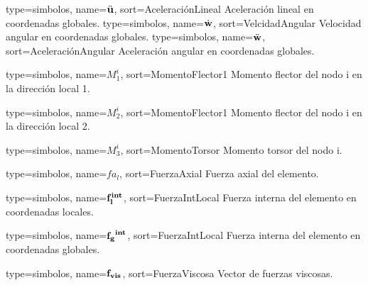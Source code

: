 {
	type={simbolos},
	name={$\ddot{\bf{u}}$}, %
	sort={AceleraciónLineal} %
}
{Aceleración lineal en coordenadas globales.}
{
	type={simbolos},
	name={$\dot{\bf{w}}$}, %
	sort={VelcidadAngular} %
}
{Velocidad angular en coordenadas globales.}
{
	type={simbolos},
	name={$\ddot{\bf{w}}$}, %
	sort={AceleraciónAngular} %
}
{Aceleración angular en coordenadas globales.}

{
	type={simbolos},
	name={$M^i_1$}, %
	sort={MomentoFlector1} %
}
{Momento flector del nodo i en la dirección local 1.}


{
	type={simbolos},
	name={$M^i_2$}, %
	sort={MomentoFlector1} %
}
{Momento flector del nodo i en la dirección local 2.}

{
	type={simbolos},
	name={$M^i_3$}, %
	sort={MomentoTorsor} %
}
{Momento torsor del nodo i.}


{
	type={simbolos},
	name={$fa_l$}, %
	sort={FuerzaAxial} %
}
{Fuerza axial del elemento.}

{
	type={simbolos},
	name={$\bf{ f_l^{int}}$}, %
	sort={FuerzaIntLocal} %
}
{Fuerza interna del elemento en coordenadas locales.}

{
	type={simbolos},
	name={$\bf{f_g}^{int}$}, %
	sort={FuerzaIntLocal} %
}
{Fuerza interna del elemento en coordenadas globales.}

{
	type={simbolos},
	name={$\bf{f_{vis}}$}, %
	sort={FuerzaViscosa} %
}
{Vector de fuerzas viscosas.}

